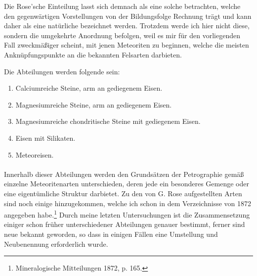 \documentclass[a4paper, 12pt, oneside]{article}
\begin{document}
Die Rose'sche Einteilung lasst sich demnach als eine solche betrachten, welche den gegenwärtigen Vorstellungen von der Bildungsfolge Rechnung trägt und kann daher als eine natürliche bezeichnet werden. Trotzdem werde ich hier nicht diese, sondern die umgekehrte Anordnung befolgen, weil es mir für den vorliegenden Fall zweckmäßiger scheint, mit jenen Meteoriten zu beginnen, welche die meisten Anknüpfungspunkte an die bekannten Felsarten darbieten.

Die Abteilungen werden folgende sein:
\begin{enumerate}
    \item Calciumreiche Steine, arm an gediegenem Eisen.  
    \item Magnesiumreiche Steine, arm an gediegenem Eisen.  
    \item Magnesiumreiche chondritische Steine mit gediegenem Eisen.  
    \item Eisen mit Silikaten.  
    \item Meteoreisen.
\end{enumerate}
\paragraph*{}
Innerhalb dieser Abteilungen werden den Grundsätzen der Petrographie gemäß einzelne Meteoritenarten unterschieden, deren jede ein besonderes Gemenge oder eine eigentümliche Struktur darbietet. Zu den von G. Rose aufgestellten Arten sind noch einige hinzugekommen, welche ich schon in dem Verzeichnisse von 1872 angegeben habe.\footnote{Mineralogische Mitteilungen 1872, p. 165.} Durch meine letzten Untersuchungen ist die Zusammensetzung einiger schon früher unterschiedener Abteilungen genauer bestimmt, ferner sind neue bekannt geworden, so dass in einigen Fällen eine Umstellung und Neubenennung erforderlich wurde.
\end{document}
